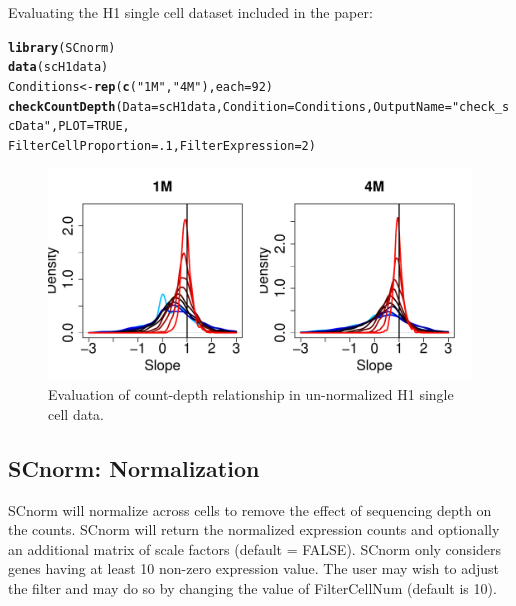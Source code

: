 \documentclass{article}\usepackage[]{graphicx}\usepackage[usenames,dvipsnames]{color}
\makeatletter
\newcommand{\hlnum}[1]{\textcolor[rgb]{0.686,0.059,0.569}{#1}}%
\newcommand{\hlstr}[1]{\textcolor[rgb]{0.192,0.494,0.8}{#1}}%
\newcommand{\hlstd}[1]{\textcolor[rgb]{0.345,0.345,0.345}{#1}}%
\newcommand{\hlkwb}[1]{\textcolor[rgb]{0.69,0.353,0.396}{#1}}%
\newcommand{\hlkwc}[1]{\textcolor[rgb]{0.333,0.667,0.333}{#1}}%
\newcommand{\hlkwd}[1]{\textcolor[rgb]{0.737,0.353,0.396}{\textbf{#1}}}%
\newenvironment{kframe}{%
 \def\at@end@of@kframe{}%
 \ifinner\ifhmode%
  \def\at@end@of@kframe{\end{minipage}}%
  \begin{minipage}{\columnwidth}%
 \fi\fi%
 \def\FrameCommand##1{\hskip\@totalleftmargin \hskip-\fboxsep
 \colorbox{shadecolor}{##1}\hskip-\fboxsep
     \hskip-\linewidth \hskip-\@totalleftmargin \hskip\columnwidth}%
 \MakeFramed {\advance\hsize-\width
   \@totalleftmargin\z@ \linewidth\hsize
   \@setminipage}}%
 {\par\unskip\endMakeFramed%
 \at@end@of@kframe}
\newenvironment{knitrout}{}{} %
\makeatother
\begin{document}
Evaluating the H1 single cell dataset included in the paper:
\begin{knitrout}
\color{fgcolor}\begin{kframe}
\begin{alltt}
\hlkwd{library}\hlstd{(SCnorm)}
\hlkwd{data}\hlstd{(scH1data)}
\hlstd{Conditions} \hlkwb{<-} \hlkwd{rep}\hlstd{(}\hlkwd{c}\hlstd{(}\hlstr{"1M"}\hlstd{,} \hlstr{"4M"}\hlstd{),} \hlkwc{each}\hlstd{=}\hlnum{92}\hlstd{)}
\hlkwd{checkCountDepth}\hlstd{(}\hlkwc{Data} \hlstd{= scH1data,} \hlkwc{Condition} \hlstd{= Conditions,} \hlkwc{OutputName} \hlstd{=} \hlstr{"check_scData"}\hlstd{,} \hlkwc{PLOT}\hlstd{=}\hlnum{TRUE}\hlstd{,}
                \hlkwc{FilterCellProportion} \hlstd{=} \hlnum{.1}\hlstd{,} \hlkwc{FilterExpression} \hlstd{=} \hlnum{2}\hlstd{)}
\end{alltt}
\end{kframe}
\end{knitrout}

\begin{figure}[h!]
\centering
\includegraphics[width=.7\textwidth]{check_scData_initial_evaluation}
\caption{Evaluation of count-depth relationship in un-normalized H1 single cell data.}
\end{figure}

\newpage




  \subsection{SCnorm: Normalization}
\label{sec:Normalization}
SCnorm will normalize across cells to remove the effect of sequencing depth on the counts. SCnorm will return the normalized expression counts and optionally an additional matrix of scale factors (default = FALSE).  SCnorm only considers genes having at least 10 non-zero expression value. The user may wish to adjust the filter and may do so by changing the value of FilterCellNum (default is 10).
\end{document}
